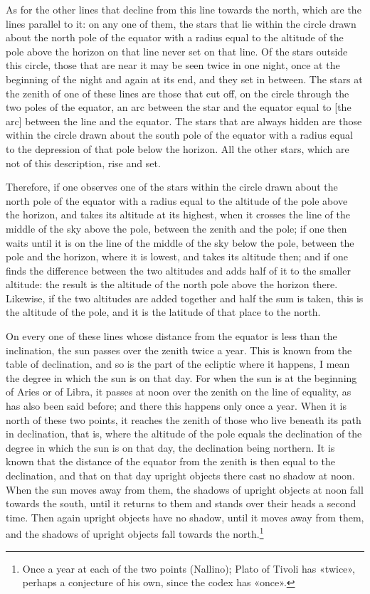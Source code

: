 \documentclass[11pt]{article}
\newcommand{\ArPage}[1]{\marginpar{\footnotesize\color{gray}Ar.\,p.\,#1}}
\begin{document}
\par As for the other lines that decline from this line towards the north, which are the lines parallel to it: on any one of them, the stars that lie within the circle drawn about the north pole of the equator with a radius equal to the altitude of the pole above the horizon on that line never set on that line. Of the stars outside this circle, those that are near it may be seen twice in one night, once at the beginning of the night and again at its end, and they set in between. The stars at the zenith of one of these lines are those that cut off, on the circle through the two poles of the equator, an arc between the star and the equator equal to [the arc] between the line and the equator. The stars that are always hidden are those within the circle drawn about the south pole of the equator with a radius equal to the depression of that pole below the horizon. All the other stars, which are not of this description, rise and set.\par
\par Therefore, if one observes one of the stars within the circle drawn about the north pole of the equator with a radius equal to the altitude of the pole above the horizon, and takes its altitude at its highest, when it crosses the line of the middle of the sky above the pole, between the zenith and the pole; if one then waits until it is on the line of the middle of the sky below the pole, between the pole and the horizon, where it is lowest, and takes its altitude then; and if one finds the difference between the two altitudes and adds half of it to the smaller altitude: the result is the altitude of the north pole above the horizon there. Likewise, if the two altitudes are added together and half the sum is taken, this is the altitude of the pole, and it is the latitude of that place to the north.\par
\par \ArPage{23}On every one of these lines whose distance from the equator is less than the inclination, the sun passes over the zenith twice a year. This is known from the table of declination, and so is the part of the ecliptic where it happens, I mean the degree in which the sun is on that day. For when the sun is at the beginning of Aries or of Libra, it passes at noon over the zenith on the line of equality, as has also been said before; and there this happens only once a year. When it is north of these two points, it reaches the zenith of those who live beneath its path in declination, that is, where the altitude of the pole equals the declination of the degree in which the sun is on that day, the declination being northern. It is known that the distance of the equator from the zenith is then equal to the declination, and that on that day upright objects there cast no shadow at noon. When the sun moves away from them, the shadows of upright objects at noon fall towards the south, until it returns to them and stands over their heads a second time. Then again upright objects have no shadow, until it moves away from them, and the shadows of upright objects fall towards the north.\footnote{Once a year at each of the two points (Nallino); Plato of Tivoli has «twice», perhaps a conjecture of his own, since the codex has «once».}\par
\end{document}
